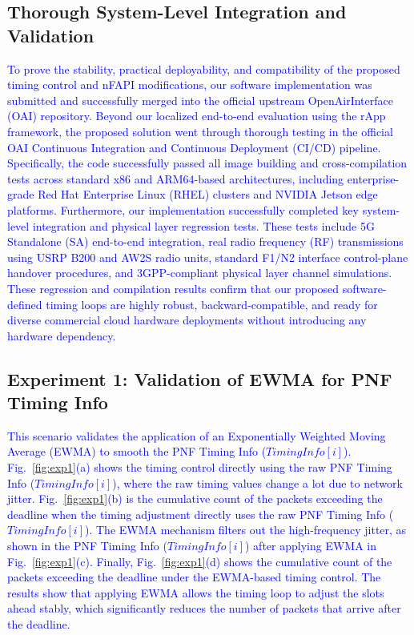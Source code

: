 \documentclass[10pt, conference, letterpaper]{IEEEtran}
\begin{document}
\subsection{Thorough System-Level Integration and Validation}
\label{subsec:software_validation}

\textcolor{blue}{To prove the stability, practical deployability, and compatibility of the proposed timing control and nFAPI modifications, our software implementation was submitted and successfully merged into the official upstream OpenAirInterface (OAI) repository. Beyond our localized end-to-end evaluation using the rApp framework, the proposed solution went through thorough testing in the official OAI Continuous Integration and Continuous Deployment (CI/CD) pipeline. Specifically, the code successfully passed all image building and cross-compilation tests across standard x86 and ARM64-based architectures, including enterprise-grade Red Hat Enterprise Linux (RHEL) clusters and NVIDIA Jetson edge platforms. Furthermore, our implementation successfully completed key system-level integration and physical layer regression tests. These tests include 5G Standalone (SA) end-to-end integration, real radio frequency (RF) transmissions using USRP B200 and AW2S radio units, standard F1/N2 interface control-plane handover procedures, and 3GPP-compliant physical layer channel simulations. These regression and compilation results confirm that our proposed software-defined timing loops are highly robust, backward-compatible, and ready for diverse commercial cloud hardware deployments without introducing any hardware dependency.}

\subsection{Experiment 1: Validation of EWMA for PNF Timing Info}
\label{subsec:scenario_1}

\textcolor{blue}{This scenario validates the application of an Exponentially Weighted Moving Average (EWMA) to smooth the PNF Timing Info ($\mathit{TimingInfo}[i]$). Fig.~\ref{fig:exp1}(a) shows the timing control directly using the raw PNF Timing Info ($\mathit{TimingInfo}[i]$), where the raw timing values change a lot due to network jitter. Fig.~\ref{fig:exp1}(b) is the cumulative count of the packets exceeding the deadline when the timing adjustment directly uses the raw PNF Timing Info ($\mathit{TimingInfo}[i]$). The EWMA mechanism filters out the high-frequency jitter, as shown in the PNF Timing Info ($\mathit{TimingInfo}[i]$) after applying EWMA in Fig.~\ref{fig:exp1}(c). Finally, Fig.~\ref{fig:exp1}(d) shows the cumulative count of the packets exceeding the deadline under the EWMA-based timing control. The results show that applying EWMA allows the timing loop to adjust the slots ahead stably, which significantly reduces the number of packets that arrive after the deadline.}
\end{document}
